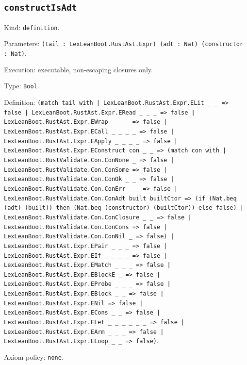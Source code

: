 \documentclass[11pt]{article}
\begin{document}
\subsection*{\texttt{constructIsAdt}}
\noindent Kind: \texttt{definition}.\par
\noindent Parameters: \texttt{(tail : LexLeanBoot.RustAst.Expr) (adt : Nat) (constructor : Nat)}.\par
\noindent Execution: executable, non-escaping closures only.\par
\noindent Type: \texttt{Bool}.\par
\noindent Definition: \texttt{(match tail with | LexLeanBoot.RustAst.Expr.ELit \_ \_ => false | LexLeanBoot.RustAst.Expr.ERead \_ \_ \_ => false | LexLeanBoot.RustAst.Expr.EWrap \_ \_ \_ => false | LexLeanBoot.RustAst.Expr.ECall \_ \_ \_ \_ => false | LexLeanBoot.RustAst.Expr.EApply \_ \_ \_ \_ => false | LexLeanBoot.RustAst.Expr.EConstruct con \_ \_ => (match con with | LexLeanBoot.RustValidate.Con.ConNone \_ => false | LexLeanBoot.RustValidate.Con.ConSome => false | LexLeanBoot.RustValidate.Con.ConOk \_ \_ => false | LexLeanBoot.RustValidate.Con.ConErr \_ \_ => false | LexLeanBoot.RustValidate.Con.ConAdt built builtCtor => (if (Nat.beq (adt) (built)) then (Nat.beq (constructor) (builtCtor)) else false) | LexLeanBoot.RustValidate.Con.ConClosure \_ \_ => false | LexLeanBoot.RustValidate.Con.ConCons => false | LexLeanBoot.RustValidate.Con.ConNil \_ => false) | LexLeanBoot.RustAst.Expr.EPair \_ \_ \_ => false | LexLeanBoot.RustAst.Expr.EIf \_ \_ \_ \_ => false | LexLeanBoot.RustAst.Expr.EMatch \_ \_ \_ => false | LexLeanBoot.RustAst.Expr.EBlockE \_ => false | LexLeanBoot.RustAst.Expr.EProbe \_ \_ \_ => false | LexLeanBoot.RustAst.Expr.EBlock \_ \_ => false | LexLeanBoot.RustAst.Expr.ENil => false | LexLeanBoot.RustAst.Expr.ECons \_ \_ => false | LexLeanBoot.RustAst.Expr.ELet \_ \_ \_ \_ \_ \_ => false | LexLeanBoot.RustAst.Expr.EArm \_ \_ \_ => false | LexLeanBoot.RustAst.Expr.ELoop \_ \_ => false)}.\par
\noindent Axiom policy: \texttt{none}.\par
\end{document}

